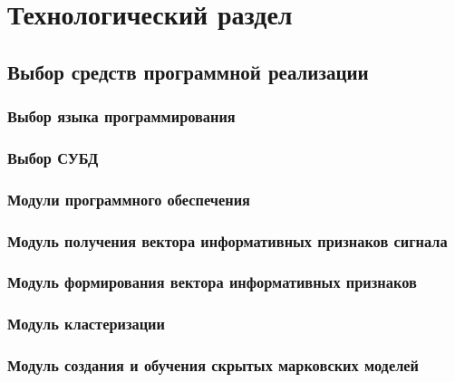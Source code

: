\chapter{Технологический раздел}
\section{Выбор средств программной реализации}
\subsection{Выбор языка программирования}
\subsection{Выбор СУБД}
\subsection{Модули программного обеспечения}
\subsection{Модуль получения вектора информативных признаков сигнала}
\subsection{Модуль формирования вектора информативных признаков}
\subsection{Модуль кластеризации}
\subsection{Модуль создания и обучения скрытых марковских моделей}